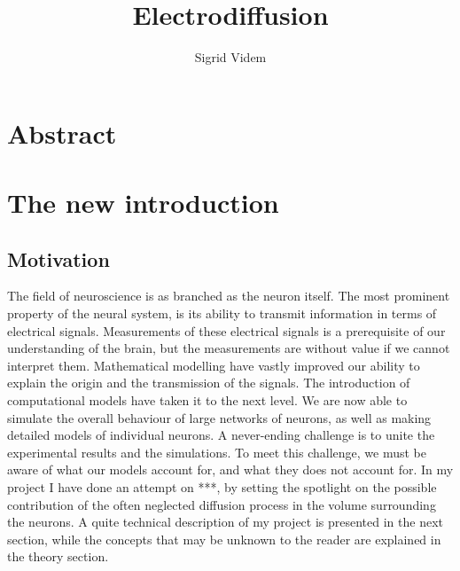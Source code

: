 \documentclass{article}
\author{Sigrid Videm}
\title{Electrodiffusion}
\begin{document}
\maketitle


\section{Abstract} 
\tableofcontents %
\section{The new introduction}
\subsection{Motivation}
The field of neuroscience is as branched as the neuron itself. The most prominent property of the neural system, is its ability to transmit information in terms of electrical signals. Measurements of these electrical signals is a prerequisite of our understanding of the brain, but the measurements are without value if we cannot interpret them. Mathematical modelling have vastly improved our ability to explain the origin and the transmission of the signals. The introduction of computational models have taken it to the next level. We are now able to simulate the overall behaviour of large networks of neurons, as well as making detailed models of individual neurons. A never-ending challenge is to unite the experimental results and the simulations. To meet this challenge, we must be aware of what our models account for, and what they does not account for. In my project I have done an attempt on ***, by setting the spotlight on the possible contribution of the often neglected diffusion process in the volume surrounding the neurons. A quite technical description of my project is presented in the next section, while the concepts that may be unknown to the reader are explained in the theory section. 
\end{document}
